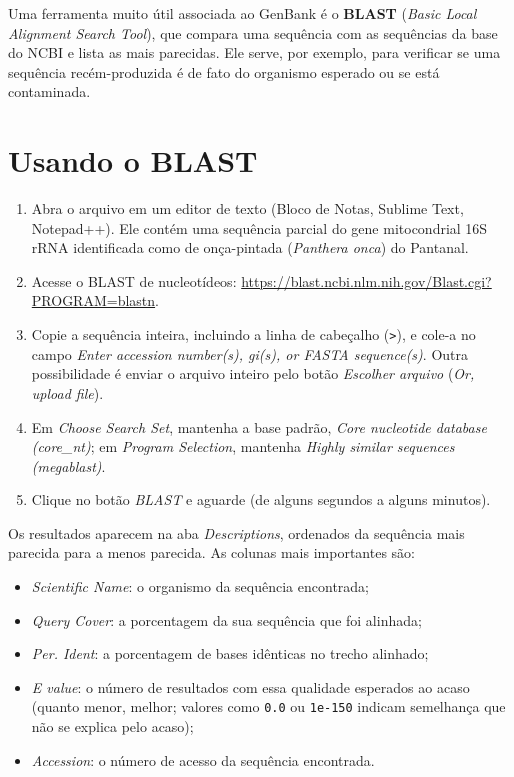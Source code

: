 \documentclass[11pt,a4paper]{article}
\newcommand{\arq}[1]{\path{#1}}
\newcommand{\ui}[1]{\textit{#1}}
\begin{document}
Uma ferramenta muito útil associada ao GenBank é o \textbf{BLAST} (\emph{Basic Local Alignment
Search Tool}), que compara uma sequência com as sequências da base do NCBI e lista as mais
parecidas. Ele serve, por exemplo, para verificar se uma sequência recém-produzida é de fato do
organismo esperado ou se está contaminada.

\section{Usando o BLAST}\label{sec:blast}

\begin{enumerate}
\item Abra o arquivo \arq{dados/panthera_onca.fas} em um editor de texto (Bloco de Notas,
Sublime Text, Notepad++). Ele contém uma sequência parcial do gene mitocondrial 16S rRNA
identificada como de onça-pintada (\emph{Panthera onca}) do Pantanal.
\item Acesse o BLAST de nucleotídeos:
\url{https://blast.ncbi.nlm.nih.gov/Blast.cgi?PROGRAM=blastn}.
\item Copie a sequência inteira, incluindo a linha de cabeçalho (\verb|>|), e cole-a no campo
\ui{Enter accession number(s), gi(s), or FASTA sequence(s)}. Outra possibilidade é enviar o
arquivo inteiro pelo botão \ui{Escolher arquivo} (\ui{Or, upload file}).
\item Em \ui{Choose Search Set}, mantenha a base padrão, \ui{Core nucleotide database
(core\_nt)}; em \ui{Program Selection}, mantenha \ui{Highly similar sequences (megablast)}.
\item Clique no botão \ui{BLAST} e aguarde (de alguns segundos a alguns minutos).
\end{enumerate}

Os resultados aparecem na aba \ui{Descriptions}, ordenados da sequência mais parecida para a
menos parecida. As colunas mais importantes são:
\begin{itemize}
\item \ui{Scientific Name}: o organismo da sequência encontrada;
\item \ui{Query Cover}: a porcentagem da sua sequência que foi alinhada;
\item \ui{Per. Ident}: a porcentagem de bases idênticas no trecho alinhado;
\item \ui{E value}: o número de resultados com essa qualidade esperados ao acaso (quanto menor,
melhor; valores como \texttt{0.0} ou \texttt{1e-150} indicam semelhança que não se explica
pelo acaso);
\item \ui{Accession}: o número de acesso da sequência encontrada.
\end{itemize}
\end{document}
